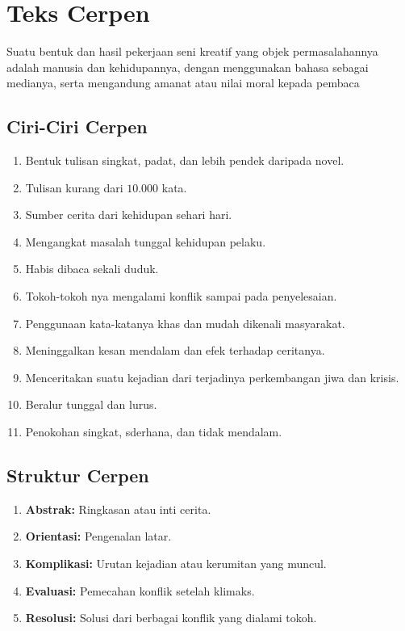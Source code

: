\section{Teks Cerpen}
\begin{definition}
  Suatu bentuk dan hasil pekerjaan seni kreatif yang objek permasalahannya adalah manusia dan kehidupannya, dengan menggunakan bahasa sebagai medianya, serta mengandung amanat atau nilai moral kepada pembaca
\end{definition}
\subsection{Ciri-Ciri Cerpen}
\begin{enumerate}
\item Bentuk tulisan singkat, padat, dan lebih pendek daripada novel.
\item Tulisan kurang dari $10.000$ kata.
\item Sumber cerita dari kehidupan sehari hari.
\item Mengangkat masalah tunggal kehidupan pelaku.
\item Habis dibaca sekali duduk.
\item Tokoh-tokoh nya mengalami konflik sampai pada penyelesaian.
\item Penggunaan kata-katanya khas dan mudah dikenali masyarakat.
\item Meninggalkan kesan mendalam dan efek terhadap ceritanya.
\item Menceritakan suatu kejadian dari terjadinya perkembangan jiwa dan krisis.
\item Beralur tunggal dan lurus.
\item Penokohan singkat, sderhana, dan tidak mendalam.
\end{enumerate}

\subsection{Struktur Cerpen}
\begin{enumerate}
\item \textbf{Abstrak: } Ringkasan atau inti cerita.
\item \textbf{Orientasi: } Pengenalan latar.
\item \textbf{Komplikasi: } Urutan kejadian atau kerumitan yang muncul.
\item \textbf{Evaluasi: } Pemecahan konflik setelah klimaks.
\item \textbf{Resolusi: } Solusi dari berbagai konflik yang dialami tokoh.
\end{enumerate}
